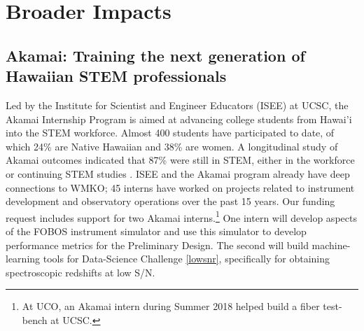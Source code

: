 \documentclass[oneside,11pt]{amsart}
\begin{document}








\section{Broader Impacts}
\label{sec:bi}

\subsection{Akamai: Training the next generation of Hawaiian STEM
professionals} Led by the Institute for Scientist and Engineer Educators
(ISEE) at UCSC, the Akamai Internship Program is aimed at advancing
college students from Hawai'i into the STEM workforce.  Almost 400
students have participated to date, of which 24\% are Native Hawaiian
and 38\% are women. A longitudinal study of Akamai outcomes indicated
that 87\% were still in STEM, either in the workforce or continuing STEM
studies \citep{asee_peer_31030}.  ISEE and the Akamai program already have deep connections to WMKO; 45 interns have
worked on projects related to instrument
development and observatory operations over the past 15 years.  Our
funding request includes support for two Akamai interns.\footnote{
%
At UCO, an Akamai intern during Summer 2018 helped build a fiber
test-bench at UCSC.}
%
One intern will develop aspects of the FOBOS instrument simulator and use this simulator to develop performance metrics
for the Preliminary Design.  The second will build machine-learning tools for Data-Science Challenge \ref{lowsnr},
specifically for obtaining spectroscopic redshifts at low S/N.
\end{document}
